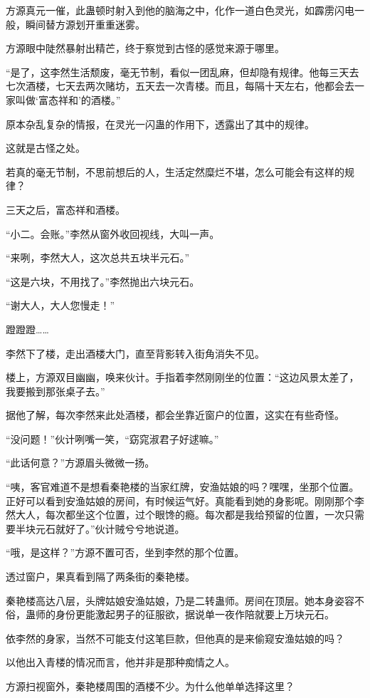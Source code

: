 \begin{this_body}
方源真元一催，此蛊顿时射入到他的脑海之中，化作一道白色灵光，如霹雳闪电一般，瞬间替方源划开重重迷雾。

方源眼中陡然暴射出精芒，终于察觉到古怪的感觉来源于哪里。

“是了，这李然生活颓废，毫无节制，看似一团乱麻，但却隐有规律。他每三天去七次酒楼，七天去两次赌坊，五天去一次青楼。而且，每隔十天左右，他都会去一家叫做‘富态祥和’的酒楼。”

原本杂乱复杂的情报，在灵光一闪蛊的作用下，透露出了其中的规律。

这就是古怪之处。

若真的毫无节制，不思前想后的人，生活定然糜烂不堪，怎么可能会有这样的规律？

三天之后，富态祥和酒楼。

“小二。会账。”李然从窗外收回视线，大叫一声。

“来咧，李然大人，这次总共五块半元石。”

“这是六块，不用找了。”李然抛出六块元石。

“谢大人，大人您慢走！”

蹬蹬蹬……

李然下了楼，走出酒楼大门，直至背影转入街角消失不见。

楼上，方源双目幽幽，唤来伙计。手指着李然刚刚坐的位置：“这边风景太差了，我要搬到那张桌子去。”

据他了解，每次李然来此处酒楼，都会坐靠近窗户的位置，这实在有些奇怪。

“没问题！”伙计咧嘴一笑，“窈窕淑君子好逑嘛。”

“此话何意？”方源眉头微微一扬。

“咦，客官难道不是想看秦艳楼的当家红牌，安渔姑娘的吗？嘿嘿，坐那个位置。正好可以看到安渔姑娘的房间，有时候运气好。真能看到她的身影呢。刚刚那个李然大人，每次都坐这个位置，过个眼馋的瘾。每次都是我给预留的位置，一次只需要半块元石就好了。”伙计贼兮兮地说道。

“哦，是这样？”方源不置可否，坐到李然的那个位置。

透过窗户，果真看到隔了两条街的秦艳楼。

秦艳楼高达八层，头牌姑娘安渔姑娘，乃是二转蛊师。房间在顶层。她本身姿容不俗，蛊师的身份更能激起男子的征服欲，据说单一夜作陪就要上万块元石。

依李然的身家，当然不可能支付这笔巨款，但他真的是来偷窥安渔姑娘的吗？

以他出入青楼的情况而言，他并非是那种痴情之人。

方源扫视窗外，秦艳楼周围的酒楼不少。为什么他单单选择这里？


\end{this_body}
